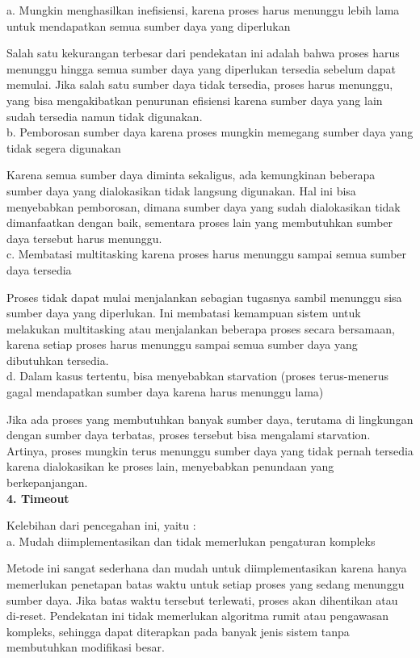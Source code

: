 \documentclass[12pt]{article}
\begin{document}
    a. Mungkin menghasilkan inefisiensi, karena proses harus menunggu lebih lama untuk mendapatkan semua sumber daya yang diperlukan
    
    Salah satu kekurangan terbesar dari pendekatan ini adalah bahwa proses harus menunggu hingga semua sumber daya yang diperlukan tersedia sebelum dapat memulai. Jika salah satu sumber daya tidak tersedia, proses harus menunggu, yang bisa mengakibatkan penurunan efisiensi karena sumber daya yang lain sudah tersedia namun tidak digunakan.\\

    b. Pemborosan sumber daya karena proses mungkin memegang sumber daya yang tidak segera digunakan
    
    Karena semua sumber daya diminta sekaligus, ada kemungkinan beberapa sumber daya yang dialokasikan tidak langsung digunakan. Hal ini bisa menyebabkan pemborosan, dimana sumber daya yang sudah dialokasikan tidak dimanfaatkan dengan baik, sementara proses lain yang membutuhkan sumber daya tersebut harus menunggu.\\

    c. Membatasi multitasking karena proses harus menunggu sampai semua sumber daya tersedia
    
    Proses tidak dapat mulai menjalankan sebagian tugasnya sambil menunggu sisa sumber daya yang diperlukan. Ini membatasi kemampuan sistem untuk melakukan multitasking atau menjalankan beberapa proses secara bersamaan, karena setiap proses harus menunggu sampai semua sumber daya yang dibutuhkan tersedia.\\

    d. Dalam kasus tertentu, bisa menyebabkan starvation (proses terus-menerus gagal mendapatkan sumber daya karena harus menunggu lama)
    
    Jika ada proses yang membutuhkan banyak sumber daya, terutama di lingkungan dengan sumber daya terbatas, proses tersebut bisa mengalami starvation. Artinya, proses mungkin terus menunggu sumber daya yang tidak pernah tersedia karena dialokasikan ke proses lain, menyebabkan penundaan yang berkepanjangan. \\

\textbf{4. Timeout\\}

    Kelebihan dari pencegahan ini, yaitu :\\

    a. Mudah diimplementasikan dan tidak memerlukan pengaturan kompleks
    
    Metode ini sangat sederhana dan mudah untuk diimplementasikan karena hanya memerlukan penetapan batas waktu untuk setiap proses yang sedang menunggu sumber daya. Jika batas waktu tersebut terlewati, proses akan dihentikan atau di-reset. Pendekatan ini tidak memerlukan algoritma rumit atau pengawasan kompleks, sehingga dapat diterapkan pada banyak jenis sistem tanpa membutuhkan modifikasi besar.\\
\end{document}

